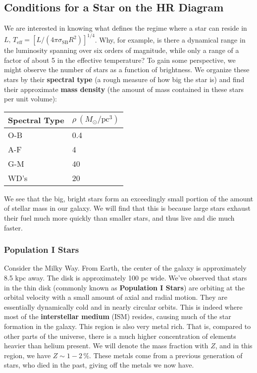 \documentclass[10pt]{article}
\newcommand{\n}{\noindent}
\begin{document}
	\subsection{Conditions for a Star on the HR Diagram}
	We are interested in knowing what defines the regime where a star can reside in $L,\,T_{\mathrm{eff}}=[L/(4\pi\sigma_{\mathrm{SB}}R^2)]^{1/4}$. Why, for example, is there a dynamical range in the luminosity spanning over six orders of magnitude, while only a range of a factor of about 5 in the effective temperature? To gain some perspective, we might observe the number of stars as a function of brightness. We organize these stars by their \textbf{spectral type} (a rough measure of how big the star is) and find their approximate \textbf{mass density} (the amount of mass contained in these stars per unit volume):
	\begin{center} 
	\begin{tabular}{l l}
		Spectral Type & $\rho\ (M_\odot/\mathrm{pc^3})$\\
		\hline
		O-B & 0.4\\
		A-F & 4\\
		G-M & 40\\
		WD's & 20
	\end{tabular}
	\end{center}
	We see that the big, bright stars form an exceedingly small portion of the amount of stellar mass in our galaxy. We will find that this is because large stars exhaust their fuel much more quickly than smaller stars, and thus live and die much faster. \\
	
	\subsubsection{Population I Stars}
	\n Consider the Milky Way. From Earth, the center of the galaxy is approximately 8.5 kpc away. The disk is approximately 100 pc wide.  We've observed that stars in the thin disk (commonly known as \textbf{Population I Stars}) are orbiting at the orbital velocity with a small amount of axial and radial motion. They are essentially dynamically cold and in nearly circular orbits. This is indeed where most of the \textbf{interstellar medium} (ISM) resides, causing much of the star formation in the galaxy. This region is also very metal rich. That is, compared to other parts of the universe, there is a much higher concentration of elements heavier than helium present. We will denote the mass fraction with $Z$, and in this region, we have $Z\sim 1-2\,\%$. These metals come from a previous generation of stars, who died in the past, giving off the metals we now have.\\
	
\end{document}
